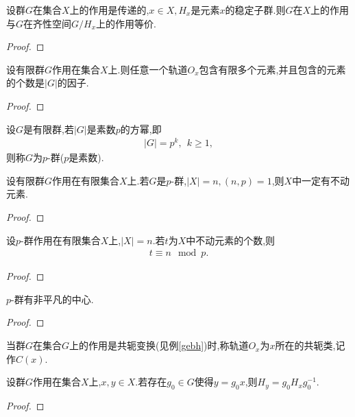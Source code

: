 \begin{corollary}
    设群$G$在集合$X$上的作用是传递的,$x\in X,H_x$是元素$x$的稳定子群.则$G$在$X$上的作用与$G$在齐性空间$G/H_x$上的作用等价.
\end{corollary}
\begin{proof}
    \stars
\end{proof}
\begin{corollary}
    设有限群$G$作用在集合$X$上.则任意一个轨道$O_x$包含有限多个元素,并且包含的元素的个数是$|G|$的因子.
\end{corollary}
\begin{proof}
    \stars
\end{proof}
\begin{definition}[$p$-群]
    设$G$是有限群,若$|G|$是素数$p$的方幂,即\begin{align*}
        |G|=p^k,\ \ k\geq1,
    \end{align*}则称$G$为$p$-群($p$是素数).
\end{definition}
\begin{corollary}\label{sdjhansjoia}
    设有限群$G$作用在有限集合$X$上.若$G$是$p$-群,$|X|=n,(n,p)=1$,则$X$中一定有不动元素.
\end{corollary}
\begin{proof}
    \stars
\end{proof}
\begin{corollary}\label{sadyhbfjk}
    设$p$-群作用在有限集合$X$上,$|X|=n$.若$t$为$X$中不动元素的个数,则\begin{align*}
        t\equiv n\mod p.
    \end{align*}
\end{corollary}
\begin{proof}
    \stars
\end{proof}
\begin{corollary}
    $p$-群有非平凡的中心.
\end{corollary}
\begin{proof}
    \stars
\end{proof}
\begin{definition}[共轭类]
    当群$G$在集合$G$上的作用是共轭变换(见例\ref{gebh})时,称轨道$O_x$为$x$所在的共轭类,记作$C(x)$.
\end{definition}
\begin{theorem}
    设群$G$作用在集合$X$上,$x,y\in X$.若存在$g_0\in G$使得$y=g_0x$,则$H_y=g_0H_xg_0^{-1}$.
\end{theorem}
\begin{proof}
    \stars
\end{proof}
